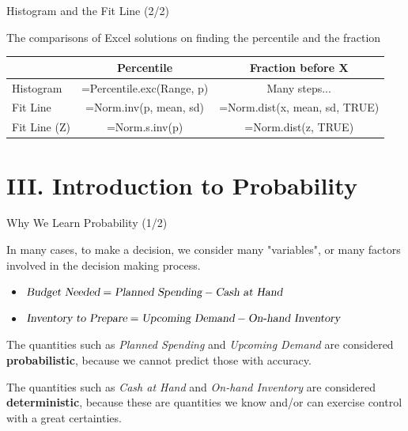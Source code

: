 \documentclass{beamer}
\begin{document}
\begin{frame}{Histogram and the Fit Line (2/2)}

The comparisons of Excel solutions on finding the percentile and the fraction

\begin{scriptsize}
\begin{center}
\begin{tabular}{l|c|c}
\hline 
 & Percentile & Fraction before X \\ 
\hline 
Histogram & =Percentile.exc(Range, p) & Many steps... \\ 
\hline 
Fit Line & =Norm.inv(p, mean, sd) & =Norm.dist(x, mean, sd, TRUE) \\ 
\hline 
Fit Line (Z) & =Norm.s.inv(p)  & =Norm.dist(z, TRUE) \\ 
\hline 
\end{tabular} 
\end{center}
\end{scriptsize}


\end{frame}









\section{III. Introduction to Probability}


\begin{frame}{Why We Learn Probability (1/2)}

In many cases, to make a decision, we consider many "variables", or many factors involved in the decision making process.

\begin{itemize}
\item $\textsl{Budget Needed} = \textsl{Planned Spending} - \textsl{Cash at Hand}$
\item $\textsl{Inventory to Prepare} = \textsl{Upcoming Demand} - \textsl{On-hand Inventory}$
\end{itemize}

\vspace{0.3cm}
The quantities such as \textsl{Planned Spending} and \textsl{Upcoming Demand} are considered \textbf{probabilistic}, because we cannot predict those with accuracy. 


\vspace{0.3cm}
The quantities such as \textsl{Cash at Hand} and \textsl{On-hand Inventory} are considered \textbf{deterministic}, because these are quantities we know and/or can exercise control with a great certainties.

\end{frame}
\end{document}
